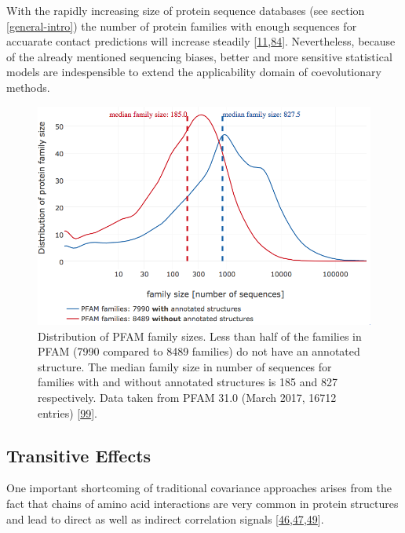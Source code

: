 \documentclass[12pt,a4paper,twoside]{book}
\theoremstyle{definition}
\theoremstyle{definition}
\theoremstyle{remark}
\begin{document}
With the rapidly increasing size of protein sequence databases (see
section \ref{general-intro}) the number of protein families with enough
sequences for accuarate contact predictions will increase steadily
{[}\protect\hyperlink{ref-TheUniProtConsortium2013}{11},\protect\hyperlink{ref-Kamisetty2013}{84}{]}.
Nevertheless, because of the already mentioned sequencing biases, better
and more sensitive statistical models are indespensible to extend the
applicability domain of coevolutionary methods.








\begin{figure}

{\centering \includegraphics[width=0.9\linewidth]{img/pfam_pdb_notitle} 

}

\caption{Distribution of PFAM family sizes. Less than half of
the families in PFAM (7990 compared to 8489 families) do not have an
annotated structure. The median family size in number of sequences for
families with and without annotated structures is 185 and 827
respectively. Data taken from PFAM 31.0 (March 2017, 16712 entries)
{[}\protect\hyperlink{ref-Finn2016}{99}{]}.}\label{fig:pfam}
\end{figure}

\hypertarget{transitive-effects}{\subsection*{Transitive
Effects}\label{transitive-effects}}

One important shortcoming of traditional covariance approaches arises
from the fact that chains of amino acid interactions are very common in
protein structures and lead to direct as well as indirect correlation
signals
{[}\protect\hyperlink{ref-Lapedes1999}{46},\protect\hyperlink{ref-Weigt2009}{47},\protect\hyperlink{ref-Burger2010}{49}{]}.
\end{document}
